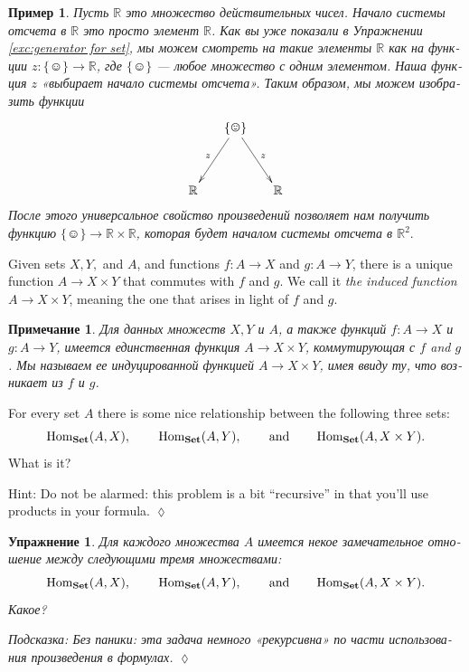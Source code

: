 \documentclass[a4paper]{book}
\def\tn{\textnormal}
\def\RR{{\mathbb R}}
\def\Hom{\tn{Hom}}
\def\hsp{\hspace{.3in}}
\def\singleton{\{\smiley\}}
\def\to{\rightarrow}
\def\taking{\colon}
\def\Set{{\bf Set}}
\theoremstyle{myth}
\newtheorem{remarkENG}[envENG]{\begin{english}Remark\end{english}}
\newtheorem{excENG}[envENG]{\begin{english}Exercise\end{english}}
\newenvironment{exerciseENG}{\begin{excENG}}{\hspace*{\fill}$\lozenge$\end{excENG}}
\newtheorem{remarkRUS}[envRUS]{Примечание}
\newtheorem{exampleRUS}[envRUS]{Пример}
\newtheorem{excRUS}[envRUS]{Упражнение}
\newenvironment{exerciseRUS}{\begin{excRUS}}{\hspace*{\fill}$\lozenge$\end{excRUS}}
\begin{document}
\begin{russian}
\begin{exampleRUS}
Пусть $\RR$ это множество действительных чисел. Начало системы отсчета в $\RR$ это просто элемент $\RR$. Как вы уже показали в Упражнении \ref{exc:generator for set}, мы можем смотреть на такие элементы $\RR$ как на функции $z\taking\singleton\to\RR$, где $\singleton$ — любое множество с одним элементом. Наша функция $z$ «выбирает начало системы отсчета». Таким образом, мы можем изобразить функции 
$$\xymatrix@=15pt{&\singleton\ar[ddr]^z\ar[ddl]_z\\\\\RR&&\RR}
$$
После этого универсальное свойство произведений позволяет нам получить функцию $\singleton\to\RR\times\RR$, которая будет началом системы отсчета в $\RR^2.$ 
\end{exampleRUS}

\begin{remarkENG}
Given sets $X, Y,$ and $A$, and functions $f\taking A\to X$ and $g\taking A\to Y$, there is a unique function $A\to X\times Y$ that commutes with $f$ and $g$. We call it {\em the induced function $A\to X\times Y$}, meaning the one that arises in light of $f$ and $g$.
\end{remarkENG}

\begin{remarkRUS}
Для данных множеств $X, Y$ и $A$, а также функций $f\taking A\to X$ и $g\taking A\to Y$, имеется единственная функция $A\to X\times Y$, коммутирующая с $f$ and $g$. Мы называем ее {\em индуцированной функцией} $A\to X\times Y$, имея ввиду ту, что возникает из $f$ и $g$. 
\end{remarkRUS}

\begin{exerciseENG}
For every set $A$ there is some nice relationship between the following three sets: $$\Hom_{\Set}(A,X), \hsp \Hom_\Set(A,Y), \hsp \text{and} \hsp\Hom_\Set(A,X\times Y).$$ What is it?

Hint: Do not be alarmed: this problem is a bit “recursive” in that you'll use products in your formula.
\end{exerciseENG}

\begin{exerciseRUS}
Для каждого множества $A$ имеется некое замечательное отношение между следующими тремя множествами: $$\Hom_{\Set}(A,X), \hsp \Hom_\Set(A,Y), \hsp \text{and} \hsp\Hom_\Set(A,X\times Y).$$ Какое?

Подсказка: Без паники: эта задача немного «рекурсивна» по части использования произведения в формулах. 
\end{exerciseRUS}


\end{russian}
\end{document}
